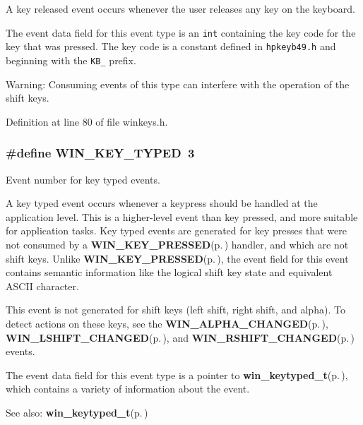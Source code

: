 A key released event occurs whenever the user releases any key on the keyboard.

The event data field for this event type is an {\tt int} containing the key code for the key that was pressed. The key code is a constant defined in {\tt hpkeyb49.h} and beginning with the {\tt KB\_\-} prefix.

\begin{Desc}
\item[Warning:]Consuming events of this type can interfere with the operation of the shift keys. \end{Desc}


Definition at line 80 of file winkeys.h.
\subsubsection{\setlength{\rightskip}{0pt plus 5cm}\#define WIN\_\-KEY\_\-TYPED~3}\label{winkeys_8h_a2}


Event number for key typed events. 

A key typed event occurs whenever a keypress should be handled at the application level. This is a higher-level event than key pressed, and more suitable for application tasks. Key typed events are generated for key presses that were not consumed by a {\bf WIN\_\-KEY\_\-PRESSED}{\rm (p.\,\pageref{winkeys_8h_a0})} handler, and which are not shift keys. Unlike {\bf WIN\_\-KEY\_\-PRESSED}{\rm (p.\,\pageref{winkeys_8h_a0})}, the event field for this event contains semantic information like the logical shift key state and equivalent ASCII character.

This event is not generated for shift keys (left shift, right shift, and alpha). To detect actions on these keys, see the {\bf WIN\_\-ALPHA\_\-CHANGED}{\rm (p.\,\pageref{winkeys_8h_a3})}, {\bf WIN\_\-LSHIFT\_\-CHANGED}{\rm (p.\,\pageref{winkeys_8h_a4})}, and {\bf WIN\_\-RSHIFT\_\-CHANGED}{\rm (p.\,\pageref{winkeys_8h_a5})} events.

The event data field for this event type is a pointer to {\bf win\_\-keytyped\_\-t}{\rm (p.\,\pageref{structwin__keytyped__t})}, which contains a variety of information about the event.

\begin{Desc}
\item[See also:]{\bf win\_\-keytyped\_\-t}{\rm (p.\,\pageref{structwin__keytyped__t})} \end{Desc}


